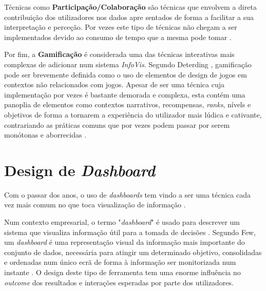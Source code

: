 Técnicas como \textbf{Participação/Colaboração} são técnicas que envolvem a direta contribuição dos utilizadores nos dados apre sentados de forma a facilitar a sua interpretação e perceção. Por vezes este tipo de técnicas não chegam a ser implementados devido ao consumo de tempo que a mesma pode tomar \cite{figueiras2015towards}. 

Por fim, a \textbf{Gamificação} é considerada uma das técnicas interativas mais complexas de adicionar num sistema \textit{InfoVis}. Segundo Deterding \cite{deterding2011game}, gamificação pode ser brevemente definida como o uso de elementos de design de jogos em contextos não relacionados com jogos. Apesar de ser uma técnica cuja implementação por vezes é bastante demorada e complexa, esta contém uma panoplia de elementos como contextos narrativos, recompensas, \textit{ranks}, nívels e objetivos de forma a tornarem a experiência do utilizador mais lúdica e cativante, contrariando as práticas comuns que por vezes podem passar por serem monótonas e aborrecidas \cite{figueiras2015towards}.

\section{Design de \textit{Dashboard}}
\label{sec:design_dashboard}

Com o passar dos anos, o uso de \textit{dashboards} tem vindo a ser uma técnica cada vez mais comum no que toca visualização de informação \cite{sarikaya2018we}. 

Num contexto empresarial, o termo "\textit{dashboard}" é usado para descrever um sistema que visualiza informação útil para a tomada de decisões \cite{janes2013effective}. Segundo Few, um \textit{dashboard} é uma representação visual da informação mais importante do conjunto de dados, necessária para atingir um determinado objetivo, consolidadas e ordenadas num único ecrã de forma à informação ser monitorizada num instante \cite{few2005common}. O design deste tipo de ferramenta tem uma enorme influência no \textit{outcome} dos resultados e interações esperadas por parte dos utilizadores. 

